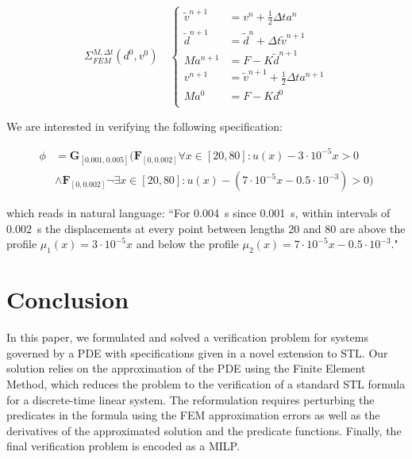 \documentclass[oribibl]{llncs/llncs}
\newcommand{\Always}{\mathbf{G}}
\newcommand{\Event}{\mathbf{F}}
\begin{document}
\begin{equation}
    \Sigma^{M, \Delta t}_{FEM}(d^0, v^0) \quad \left \{
    \begin{aligned}
        \tilde v^{n+1} &= v^n + \frac{1}{2} \Delta t a^n \\
        \tilde d^{n+1} &= \tilde d^{n} + \Delta t \tilde v^{n+1} \\
        M a^{n+1} &= F - K \tilde d^{n+1} \\
        v^{n+1} &= \tilde v^{n+1} + \frac{1}{2} \Delta t a^{n+1} \\
        M a^0 &= F - K d^0 \\
    \end{aligned}
    \right.
\end{equation}

We are interested in verifying the following specification:

\begin{equation}
\begin{aligned}
    \phi &= \Always_{[0.001, 0.005]} \bigl( \Event_{[0, 0.002]} \forall x \in [20,
    80]: u(x) - 3 \cdot 10^{-5} x > 0 \\
    &\land \Event_{[0, 0.002]} \lnot \exists x
    \in [20, 80]: u(x) - (7 \cdot 10^{-5}x - 0.5 \cdot 10^{-3}) > 0\bigr)
\end{aligned}
\end{equation}

which reads in natural language: ``For \SI{0.004}{\second} since
\SI{0.001}{\second}, within intervals of \SI{0.002}{\second} the displacements
at every point between lengths \SI{20}{} and \SI{80}{} are above the profile
$\mu_1(x) = 3 \cdot 10^{-5} x$ and below the profile $\mu_2(x) = 7 \cdot 10^{-5} x
- 0.5 \cdot 10^{-3}$."

\section{Conclusion}
\label{sec:conclusion}

In this paper, we formulated and solved a verification problem for systems governed by a
PDE with specifications given in a novel extension to STL. Our solution relies
on the approximation of the PDE using the Finite Element Method, which reduces
the problem to the verification of a standard STL formula for a discrete-time
linear system. The reformulation requires perturbing the predicates in the
formula using the FEM approximation errors as well as the derivatives of the
approximated solution and the predicate functions. Finally, the final
verification problem is encoded as a MILP.
\end{document}
